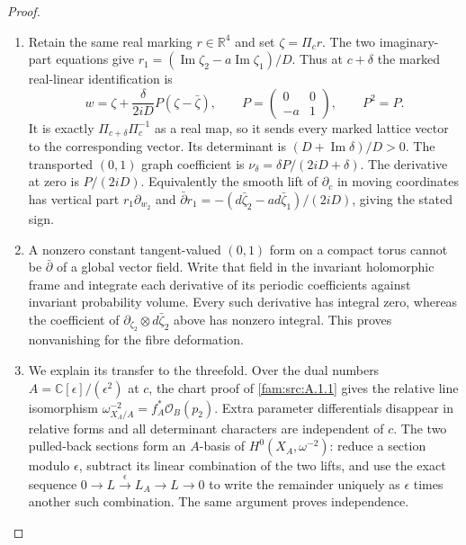 \begin{proof}
\begin{enumerate}[label=\arabic*.,leftmargin=*]
\item Retain the same real marking $r\in\mathbb R^4$ and set $\zeta=\Pi_cr$. The two imaginary-part equations give
$r_1=(\operatorname{Im}\zeta_2-a\operatorname{Im}\zeta_1)/D$. Thus at $c+\delta$ the marked real-linear identification is
\[
 w=\zeta+\frac{\delta}{2iD}P(\zeta-\bar\zeta),\qquad
 P=\begin{pmatrix}0&0\\-a&1\end{pmatrix},\qquad P^2=P.
\]
It is exactly $\Pi_{c+\delta}\Pi_c^{-1}$ as a real map, so it sends every marked lattice vector to the corresponding vector. Its determinant is $(D+\operatorname{Im}\delta)/D>0$. The transported $(0,1)$ graph coefficient is $\nu_\delta=\delta P/(2iD+\delta)$. The derivative at zero is $P/(2iD)$. Equivalently the smooth lift of $\partial_c$ in moving coordinates has vertical part $r_1\partial_{w_2}$ and $\bar\partial r_1=-(d\bar\zeta_2-a d\bar\zeta_1)/(2iD)$, giving the stated sign.

\item A nonzero constant tangent-valued $(0,1)$ form on a compact torus cannot be $\bar\partial$ of a global vector field. Write that field in the invariant holomorphic frame and integrate each derivative of its periodic coefficients against invariant probability volume. Every such derivative has integral zero, whereas the coefficient of $\partial_{\zeta_2}\otimes d\bar\zeta_2$ above has nonzero integral. This proves nonvanishing for the fibre deformation.

\item We explain its transfer to the threefold. Over the dual numbers $A=\mathbb C[\epsilon]/(\epsilon^2)$ at $c$, the chart proof of \ref{fam:src:A.1.1} gives the relative line isomorphism $\omega^{-2}_{X_A/A}=f_A^*\mathcal O_B(p_2)$. Extra parameter differentials disappear in relative forms and all determinant characters are independent of $c$. The two pulled-back sections form an $A$-basis of $H^0(X_A,\omega^{-2})$: reduce a section modulo $\epsilon$, subtract its linear combination of the two lifts, and use the exact sequence $0\to L\xrightarrow{\epsilon}L_A\to L\to0$ to write the remainder uniquely as $\epsilon$ times another such combination. The same argument proves independence.


\end{enumerate}
\end{proof}
